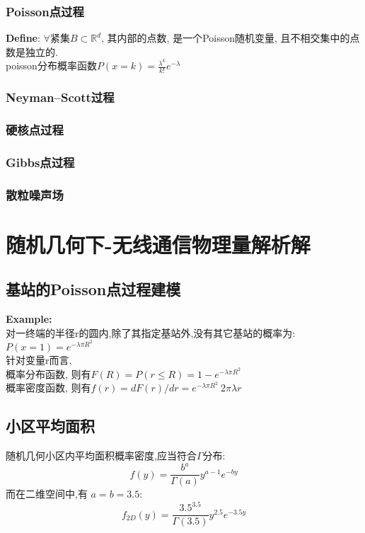 \documentclass{article}
\begin{document}
        \subsubsection{Poisson点过程}
            \textbf{Define}: $\forall$紧集$B \subset \mathbb{R}^d$, 其内部的点数, 是一个Poisson随机变量, 且不相交集中的点数是独立的.\\
            poisson分布概率函数\quad $P(x = k) = \frac{\lambda^k}{k!} e^{-\lambda}$\\
            
        \subsubsection{Neyman–Scott过程}
        
        \subsubsection{硬核点过程}
        
        \subsubsection{Gibbs点过程}
        
        \subsubsection{散粒噪声场}
    


\section{随机几何下-无线通信物理量解析解}
    \subsection{基站的Poisson点过程建模}
        \textbf{Example:}\\
            对一终端的半径r的圆内,除了其指定基站外,没有其它基站的概率为: $P(x = 1) = e^{-\lambda \pi R^2}$\\
            针对变量r而言,\\
            概率分布函数, 则有\quad $F(R) = P(r \le R) = 1 - e^{-\lambda \pi R^2}$\\
            概率密度函数, 则有\quad $f(r) = dF(r) / dr = e^{-\lambda \pi R^2}\ 2 \pi \lambda r$
    \subsection{小区平均面积}
        随机几何小区内平均面积概率密度,应当符合$\Gamma$分布:
            $$f(y)=\frac{b^{a}}{\Gamma(a)} y^{a-1} e^{-by}$$
        而在二维空间中,有 $a = b = 3.5$:
            $$f_{2 D}(y)=\frac{3.5^{3.5}}{\Gamma(3.5)} y^{2.5} e^{-3.5 y}$$
\end{document}
